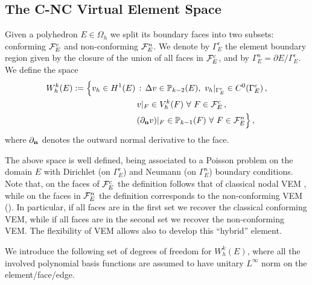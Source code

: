 \documentclass[a4paper,11pt]{article}
\theoremstyle{remark}
\theoremstyle{definition}
\newcounter{corr}
\newcommand{\Pol}{\mathbb{P}}
\begin{document}
\subsection{The C-NC Virtual Element Space}\label{sec:NC-space}
Given a polyhedron $E \in \Omega_h$ we split its boundary faces into two subsets: conforming ${\cal F}_E^c$ and non-conforming ${\cal F}_E^n$. We denote by $\Gamma^c_E$ the element boundary region given by the closure of the union of all faces in ${\cal F}_E^c$, and by $\Gamma^n_E = \partial E / \Gamma^c_E$. 
We define the space
\begin{equation}\label{eq:c-nc-space}
\begin{aligned}
W_h^k(E) := \Big\{ v_h \in H^1(E) \, & :\, \Delta v \in \Pol_{k-2}(E) , 
\ v_h|_{\Gamma^{c}_E} \in C^0(\Gamma^{c}_E) \, ,\\
&v|_F \in V_h^k(F) \ \forall \ F \in {\cal F}^c_E \, , \\
&(\partial_{{\bf n}} v)|_F \in \Pol_{k-1}(F) \ \forall \ F \in {\cal F}^n_E  \Big\} \, ,
\end{aligned}
\end{equation}
where $\partial_{{\bf n}}$ denotes the outward normal derivative to the face.

The above space is well defined, being associated to a Poisson problem on the domain $E$ with Dirichlet (on $\Gamma^c_E$) and Neumann (on $\Gamma^n_E$) boundary conditions. Note that, on the faces of ${\cal F}^c_E$ the definition follows that of classical nodal VEM \cite{BeiraodaVeiga-Brezzi-Marini:2013,beirao2016virtual}, while on the faces in ${\cal F}^n_E$ the definition corresponds to the non-conforming VEM (\cite{AyusodeDios-Lipnikov-Manzini:2016,butterflypaper}). In particular, if all faces are in the first set we recover the classical conforming VEM, while if all faces are in the second set we recover the non-conforming VEM. The flexibility of VEM allows also to develop this ``hybrid'' element.

We introduce the following set of degrees of freedom for $W^k_h(E)$, where all the involved polynomial basis functions are assumed to have unitary $L^\infty$ norm on the element/face/edge.
\end{document}
